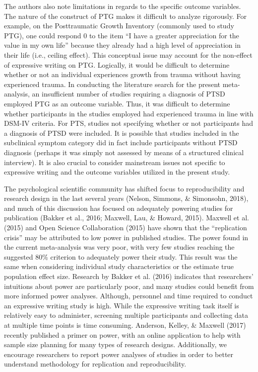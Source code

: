 \documentclass[man]{apa6}
\newcounter{author}
\theoremstyle{definition}
\theoremstyle{definition}
\theoremstyle{definition}
\theoremstyle{remark}
\begin{document}
The authors also note limitations in regards to the specific outcome
variables. The nature of the construct of PTG makes it difficult to
analyze rigorously. For example, on the Posttraumatic Growth Inventory
(commonly used to study PTG), one could respond 0 to the item \enquote{I
have a greater appreciation for the value in my own life} because they
already had a high level of appreciation in their life (i.e., ceiling
effect). This conceptual issue may account for the non-effect of
expressive writing on PTG. Logically, it would be difficult to determine
whether or not an individual experiences growth from trauma without
having experienced trauma. In conducting the literature search for the
present meta-analysis, an insufficient number of studies requiring a
diagnosis of PTSD employed PTG as an outcome variable. Thus, it was
difficult to determine whether participants in the studies employed had
experienced trauma in line with DSM-IV criteria. For PTS, studies not
specifying whether or not participants had a diagnosis of PTSD were
included. It is possible that studies included in the subclinical
symptom category did in fact include participants without PTSD diagnosis
(perhaps it was simply not assessed by means of a structured clinical
interview). It is also crucial to consider mainstream issues not
specific to expressive writing and the outcome variables utilized in the
present study.

The psychological scientific community has shifted focus to
reproducibility and research design in the last several years (Nelson,
Simmons, \& Simonsohn, 2018), and much of this discussion has focused on
adequately powering studies for publication (Bakker et al., 2016;
Maxwell, Lau, \& Howard, 2015). Maxwell et al. (2015) and Open Science
Collaboration (2015) have shown that the \enquote{replication crisis}
may be attributed to low power in published studies. The power found in
the current meta-analysis was very poor, with very few studies reaching
the suggested 80\% criterion to adequately power their study. This
result was the same when considering individual study characteristics or
the estimate true population effect size. Research by Bakker et al.
(2016) indicates that researchers' intuitions about power are
particularly poor, and many studies could benefit from more informed
power analyses. Although, personnel and time required to conduct an
expressive writing study is high. While the expressive writing task
itself is relatively easy to administer, screening multiple participants
and collecting data at multiple time points is time consuming. Anderson,
Kelley, \& Maxwell (2017) recently published a primer on power, with an
online application to help with sample size planning for many types of
research designs. Additionally, we encourage researchers to report power
analyses of studies in order to better understand methodology for
replication and reproducibility.
\end{document}
